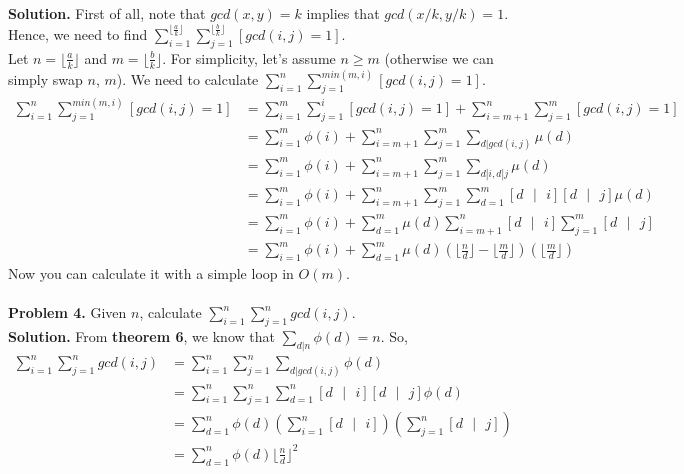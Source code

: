 \documentclass[11pt]{article}
\begin{document}
\textbf{Solution.} First of all, note that $gcd(x, y) = k$ implies that $gcd(x/k, y/k) = 1$. Hence, we need to find $\sum_{i = 1}^{\lfloor \frac{a}{k} \rfloor} \sum_{j = 1}^{\lfloor \frac{b}{k} \rfloor} [gcd(i, j) = 1]$.\\
Let $n = \lfloor \frac{a}{k} \rfloor$ and $m = \lfloor \frac{b}{k} \rfloor$. For simplicity, let's assume $n \geq m$ (otherwise we can simply swap $n$, $m$). We need to calculate $\sum_{i = 1}^{n} \sum_{j = 1}^{min(m, i)} [gcd(i, j) = 1]$.\\
\begin{align*}
  \sum_{i = 1}^{n} \sum_{j = 1}^{min(m, i)} [gcd(i, j) = 1] &= \sum_{i = 1}^{m} \sum_{j = 1}^{i} [gcd(i, j) = 1] + \sum_{i = m + 1}^{n} \sum_{j = 1}^{m} [gcd(i, j) = 1] \\
                                                                &= \sum_{i = 1}^{m} \phi(i) + \sum_{i = m + 1}^{n} \sum_{j = 1}^{m} \sum_{d | gcd(i, j)} \mu(d) \\
                                                                &= \sum_{i = 1}^{m} \phi(i) + \sum_{i = m + 1}^{n} \sum_{j = 1}^{m} \sum_{d | i, d | j} \mu(d) \\
                                                                &= \sum_{i = 1}^{m} \phi(i) + \sum_{i = m + 1}^{n} \sum_{j = 1}^{m} \sum_{d = 1}^{m} [d \text{ }| \text{ } i] [d \text{ }| \text{ }j] \mu(d) \\
                                                                &= \sum_{i = 1}^{m} \phi(i) + \sum_{d = 1}^{m} \mu(d) \sum_{i = m + 1}^{n} [d \text{ }| \text{ } i] \sum_{j = 1}^{m} [d \text{ }| \text{ }j] \\
                                                                &= \sum_{i = 1}^{m} \phi(i) + \sum_{d = 1}^{m} \mu(d) (\lfloor \frac{n}{d} \rfloor - \lfloor \frac{m}{d} \rfloor) (\lfloor \frac{m}{d} \rfloor)
\end{align*}
Now you can calculate it with a simple loop in $O(m)$.\\ \\
\textbf{Problem 4.} Given $n$, calculate $\sum_{i = 1}^{n} \sum_{j = 1}^{n} gcd(i, j)$.\\
\textbf{Solution.} From \textbf{theorem 6}, we know that $\sum_{d|n} \phi(d) = n$. So,
\begin{align*}
  \sum_{i = 1}^{n} \sum_{j = 1}^{n} gcd(i, j) &= \sum_{i = 1}^{n} \sum_{j = 1}^{n} \sum_{d | gcd(i, j)} \phi(d) \\
                                              &= \sum_{i = 1}^{n} \sum_{j = 1}^{n} \sum_{d = 1}^{n} [d \text{ }| \text{ } i] [d \text{ }| \text{ }j]\phi(d) \\
                                              &= \sum_{d = 1}^{n} \phi(d) (\sum_{i = 1}^{n} [d \text{ }| \text{ } i]) (\sum_{j = 1}^{n} [d \text{ }| \text{ } j]) \\
                                              &= \sum_{d = 1}^{n} \phi(d) {\lfloor \frac{n}{d} \rfloor}^2
\end{align*}
\end{document}
